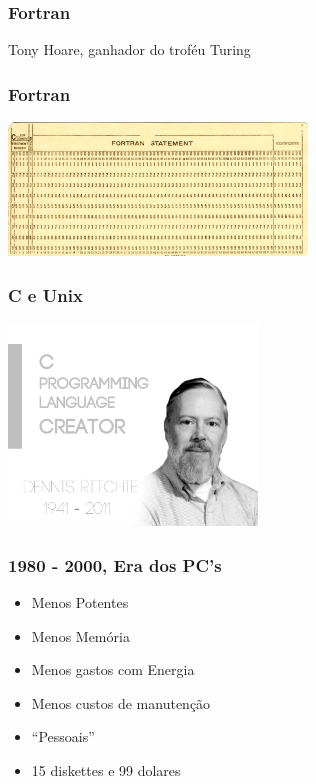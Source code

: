 \documentclass{beamer}
\begin{document}
\begin{frame} \frametitle{Fortran}
 \linebreak
 \linebreak
 Tony Hoare, ganhador do troféu Turing
 \pause
 \linebreak
\end{frame}

\begin{frame} \frametitle{Fortran}
    \includegraphics[width=300px]{images/fortran}
\end{frame}

\begin{frame} \frametitle{C e Unix}
    \includegraphics[width=250px]{images/c-unix-creator}
\end{frame}

\begin{frame} \frametitle{ 1980 - 2000, Era dos PC's}
    \begin{itemize}
     \item Menos Potentes
     \item Menos Memória
     \item Menos gastos com Energia
     \item Menos custos de manutenção
     \item ``Pessoais''
     \item 15 diskettes e 99 dolares
    \end{itemize}
\end{frame}
\end{document}
